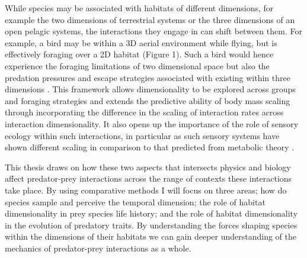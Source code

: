 While species may be associated with habitats of different dimensions, for example the two dimensions of terrestrial systems or the three dimensions of an open pelagic systems, the interactions they engage in can shift between them. For example, a bird may be within a 3D aerial environment while flying, but is effectively foraging over a 2D habitat (Figure 1). Such a bird would hence experience the foraging limitations of two dimensional space but also the predation pressures and escape strategies associated with existing within three dimensions \citep{pawar2012dimensionality}. This framework allows dimensionality to be explored across groups and foraging strategies and extends the predictive ability of body mass scaling through incorporating the difference in the scaling of interaction rates across interaction dimensionality. 
It also opens up the importance of the role of sensory ecology within such interactions, in particular as such sensory systems have shown different scaling in comparison to that predicted from metabolic theory \citep{mcgill2006allometric,kiltie2000scaling}. 


This thesis draws on how these two aspects that intersects physics and biology affect predator-prey interactions across the range of contexts these interactions take place. By using comparative methods I will focus on three areas; how do species sample and perceive the temporal dimension; the role of habitat dimensionality in prey species life history; and the role of habitat dimensionality in the evolution of predatory traits. By understanding the forces shaping species within the dimensions of their habitats we can gain deeper understanding of the mechanics of predator-prey interactions as a whole.\\


